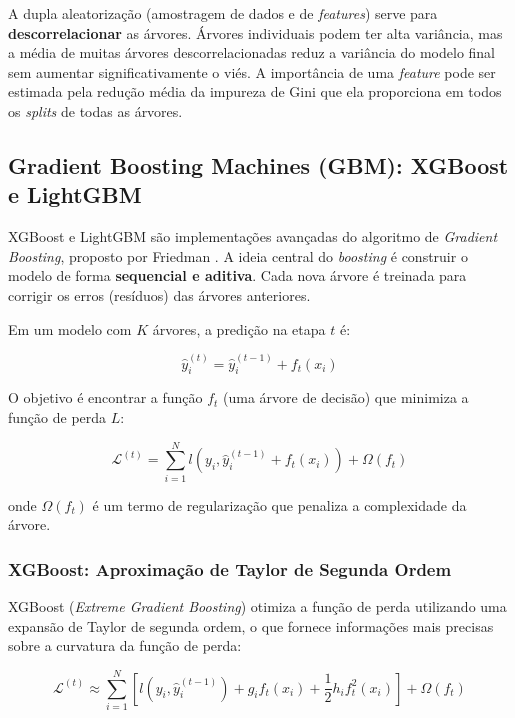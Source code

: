\documentclass[12pt, a4paper, oneside]{report}
\begin{document}
A dupla aleatorização (amostragem de dados e de \textit{features}) serve para \textbf{descorrelacionar} as árvores. Árvores individuais podem ter alta variância, mas a média de muitas árvores descorrelacionadas reduz a variância do modelo final sem aumentar significativamente o viés. A importância de uma \textit{feature} pode ser estimada pela redução média da impureza de Gini que ela proporciona em todos os \textit{splits} de todas as árvores.

\subsection{Gradient Boosting Machines (GBM): XGBoost e LightGBM}

XGBoost e LightGBM são implementações avançadas do algoritmo de \textit{Gradient Boosting}, proposto por Friedman \cite{friedman2001}. A ideia central do \textit{boosting} é construir o modelo de forma \textbf{sequencial e aditiva}. Cada nova árvore é treinada para corrigir os erros (resíduos) das árvores anteriores.

Em um modelo com $K$ árvores, a predição na etapa $t$ é:

\begin{equation}
    \hat{y}_i^{(t)} = \hat{y}_i^{(t-1)} + f_t(x_i)
\end{equation}

O objetivo é encontrar a função $f_t$ (uma árvore de decisão) que minimiza a função de perda $L$:

\begin{equation}
    \mathcal{L}^{(t)} = \sum_{i=1}^N l(y_i, \hat{y}_i^{(t-1)} + f_t(x_i)) + \Omega(f_t)
\end{equation}

onde $\Omega(f_t)$ é um termo de regularização que penaliza a complexidade da árvore.

\subsubsection{XGBoost: Aproximação de Taylor de Segunda Ordem}

XGBoost (\textit{Extreme Gradient Boosting}) \cite{chen2016} otimiza a função de perda utilizando uma expansão de Taylor de segunda ordem, o que fornece informações mais precisas sobre a curvatura da função de perda:

\begin{equation}
    \mathcal{L}^{(t)} \approx \sum_{i=1}^N \left[ l(y_i, \hat{y}_i^{(t-1)}) + g_i f_t(x_i) + \frac{1}{2} h_i f_t^2(x_i) \right] + \Omega(f_t)
\end{equation}
\end{document}
